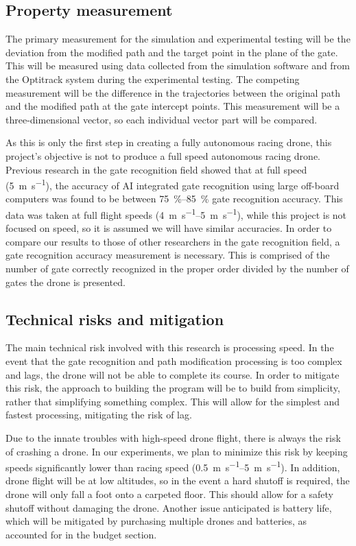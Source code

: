 \documentclass[onecolumn,10pt]{IEEEtran}
\begin{document}
\subsection{Property measurement}
The primary measurement for the simulation and experimental testing will be the deviation from the modified path and the target point in the plane of the gate. This will be measured using data collected from the simulation software and from the Optitrack system during the experimental testing. The competing measurement will be the difference in the trajectories between the original path and the modified path at the gate intercept points. This measurement will be a three-dimensional vector, so each individual vector part will be compared.  

As this is only the first step in creating a fully autonomous racing drone, this project’s objective is not to produce a full speed autonomous racing drone. Previous research \cite{jung2018perception} in the gate recognition field showed that at full speed (\SI{5}{\meter\per\second}), the accuracy of AI integrated gate recognition using large off-board computers was found to be between \SIrange{75}{85}{\percent} gate recognition accuracy. This data was taken at full flight speeds (\SIrange{4}{5}{\meter\per\second}), while this project is not focused on speed, so it is assumed we will have similar accuracies. In order to compare our results to those of other researchers in the gate recognition field, a gate recognition accuracy measurement is necessary. This is comprised of the number of gate correctly recognized in the proper order divided by the number of gates the drone is presented.

\subsection{Technical risks and mitigation}
The main technical risk involved with this research is processing speed. In the event that the gate recognition and path modification processing is too complex and lags, the drone will not be able to complete its course. In order to mitigate this risk, the approach to building the program will be to build from simplicity, rather that simplifying something complex. This will allow for the simplest and fastest processing, mitigating the risk of lag.

Due to the innate troubles with high-speed drone flight, there is always the risk of crashing a drone. In our experiments, we plan to minimize this risk by keeping speeds significantly lower than racing speed (\SIrange{0.5}{5}{\meter\per\second}). In addition, drone flight will be at low altitudes, so in the event a hard shutoff is required, the drone will only fall a foot onto a carpeted floor. This should allow for a safety shutoff without damaging the drone.  Another issue anticipated is battery life, which will be mitigated by purchasing multiple drones and batteries, as accounted for in the budget section.
\end{document}

